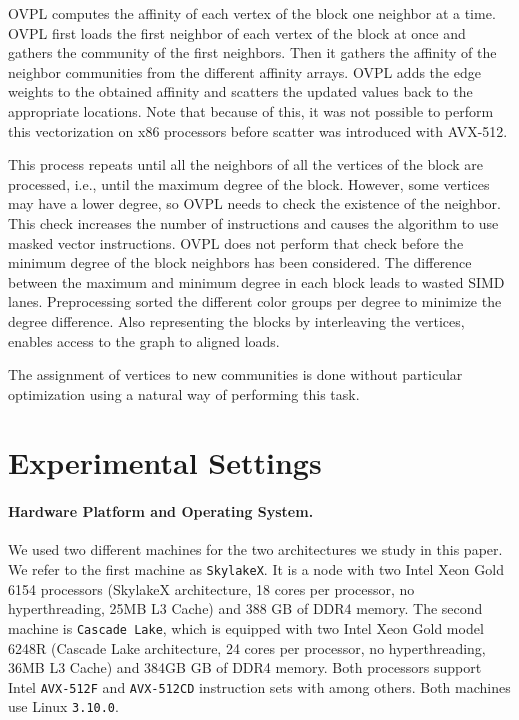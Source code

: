 \documentclass[default,iicol]{sn-jnl}%
\theoremstyle{thmstyleone}%
\theoremstyle{thmstyletwo}%
\theoremstyle{thmstylethree}%
\begin{document}
OVPL computes the affinity of each vertex of the block one neighbor at
a time. OVPL first loads the first neighbor of each vertex of the
block at once and gathers the community of the first neighbors. Then it
gathers the affinity of the neighbor communities from the different
affinity arrays. OVPL adds the edge weights to the obtained affinity
and scatters the updated values back to the appropriate locations. Note that because of this, 
it was not possible to perform this vectorization on x86 processors before scatter was introduced with AVX-512.

This process repeats until all the neighbors of all the vertices of the block are processed, i.e., until the maximum 
degree of the block. However, some vertices may have a lower degree, so OVPL needs to check the existence of the 
neighbor. This check increases the number of instructions and causes the algorithm to use masked vector instructions. 
OVPL does not perform that check before the minimum degree of the block neighbors has been considered. 
The difference between the maximum and minimum degree in each block leads to wasted SIMD lanes. Preprocessing 
sorted the different color groups per degree to minimize the degree difference. 
Also representing the blocks by interleaving the vertices, enables access to the graph to aligned loads.

The assignment of vertices to new communities is done without
particular optimization using a natural way of performing this task.


\section{Experimental Settings}
\label{sec:expsetting}
\paragraph{Hardware Platform and Operating System.}
We used two different machines for the two architectures we study in this paper. 
We refer to the first machine as \texttt{SkylakeX}. It is a node with two 
Intel Xeon Gold 6154 processors (SkylakeX architecture, 18 cores per processor, no hyperthreading, 25MB L3 Cache) and 388 GB of DDR4 memory. 
The second machine is \texttt{Cascade Lake}, which is equipped with two Intel Xeon Gold model 6248R (Cascade Lake architecture, 
24 cores per processor, no hyperthreading, 36MB L3 Cache) and 384GB GB of DDR4 memory. Both processors support Intel \texttt{AVX-512F} 
and \texttt{AVX-512CD} instruction sets with among others. Both machines use Linux \texttt{3.10.0}. 
\end{document}
